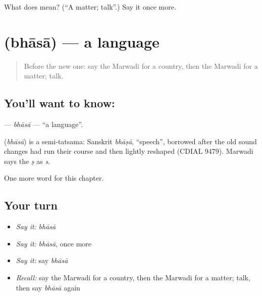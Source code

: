 \begin{tcolorbox}[breakable,colback=teal!4,colframe=teal!35!black,title={Before you move on}]
What does  mean? (\textquotedblleft{}A matter; talk\textquotedblright{}.) Say it once more.
\end{tcolorbox}
\section[\texorpdfstring{\mw{भासा} (bhāsā)}{भासा (bhāsā)}]{ (bhāsā) — a language}

\label{lesson:MW-C89-bhasa}



\begin{quote}
Before the new one: say the Marwadi for a country, then the Marwadi for a matter; talk.
\end{quote}

\subsection*{You'll want to know: }
\textbf{} — \emph{bhāsā} — \textquotedblleft{}a language\textquotedblright{}.

\begin{cousinweb}
\textbf{} (\emph{bhāsā}) is a semi-tatsama: Sanskrit \emph{bhāṣā}, \textquotedblleft{}speech\textquotedblright{}, borrowed after the old sound changes had run their course and then lightly reshaped (CDIAL 9479). Marwadi says the \emph{ṣ} as \emph{s}.
\end{cousinweb}

\begin{grammarlens}[title={What you've built}]
One more word for this chapter.
\end{grammarlens}

\subsection*{Your turn}
\begin{itemize}
\raggedright
  \item \emph{Say it:} \emph{bhāsā}
  \item \emph{Say it:} \emph{bhāsā}, once more
  \item \emph{Say it:} say \emph{bhāsā}
  \item \emph{Recall:} say the Marwadi for a country, then the Marwadi for a matter; talk, then say \emph{bhāsā} again
\end{itemize}

